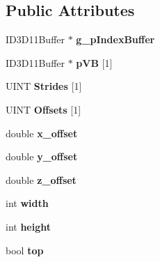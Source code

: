 \subsection*{Public Attributes}
\begin{DoxyCompactItemize}
\item 
\hypertarget{classcap_a288dc080b49448d1e90e55dc4c718b28}{I\+D3\+D11\+Buffer $\ast$ {\bfseries g\+\_\+p\+Index\+Buffer}}\label{classcap_a288dc080b49448d1e90e55dc4c718b28}

\item 
\hypertarget{classcap_a23e3cb8950ac2fc7e2598e0609f7b17b}{I\+D3\+D11\+Buffer $\ast$ {\bfseries p\+V\+B} \mbox{[}1\mbox{]}}\label{classcap_a23e3cb8950ac2fc7e2598e0609f7b17b}

\item 
\hypertarget{classcap_a7f6b0789cc79f10a797e32a16861b1c9}{U\+I\+N\+T {\bfseries Strides} \mbox{[}1\mbox{]}}\label{classcap_a7f6b0789cc79f10a797e32a16861b1c9}

\item 
\hypertarget{classcap_ade73c88103242e5ffdd405c3797699a3}{U\+I\+N\+T {\bfseries Offsets} \mbox{[}1\mbox{]}}\label{classcap_ade73c88103242e5ffdd405c3797699a3}

\item 
\hypertarget{classcap_ae5badc83328508c77260408868549d8a}{double {\bfseries x\+\_\+offset}}\label{classcap_ae5badc83328508c77260408868549d8a}

\item 
\hypertarget{classcap_a168313cf9f38c2ccff4db999672d7f5c}{double {\bfseries y\+\_\+offset}}\label{classcap_a168313cf9f38c2ccff4db999672d7f5c}

\item 
\hypertarget{classcap_a7c507d73586b2c3c318ea4c4aa801da2}{double {\bfseries z\+\_\+offset}}\label{classcap_a7c507d73586b2c3c318ea4c4aa801da2}

\item 
\hypertarget{classcap_a0c65a8c54340877588e831600c2f4f56}{int {\bfseries width}}\label{classcap_a0c65a8c54340877588e831600c2f4f56}

\item 
\hypertarget{classcap_a4f85470e03dd6c440f3f20a1f534c72c}{int {\bfseries height}}\label{classcap_a4f85470e03dd6c440f3f20a1f534c72c}

\item 
\hypertarget{classcap_a76bd8cdf8dd4eeb953b72c48ad86c048}{bool {\bfseries top}}\label{classcap_a76bd8cdf8dd4eeb953b72c48ad86c048}


\end{DoxyCompactItemize}
